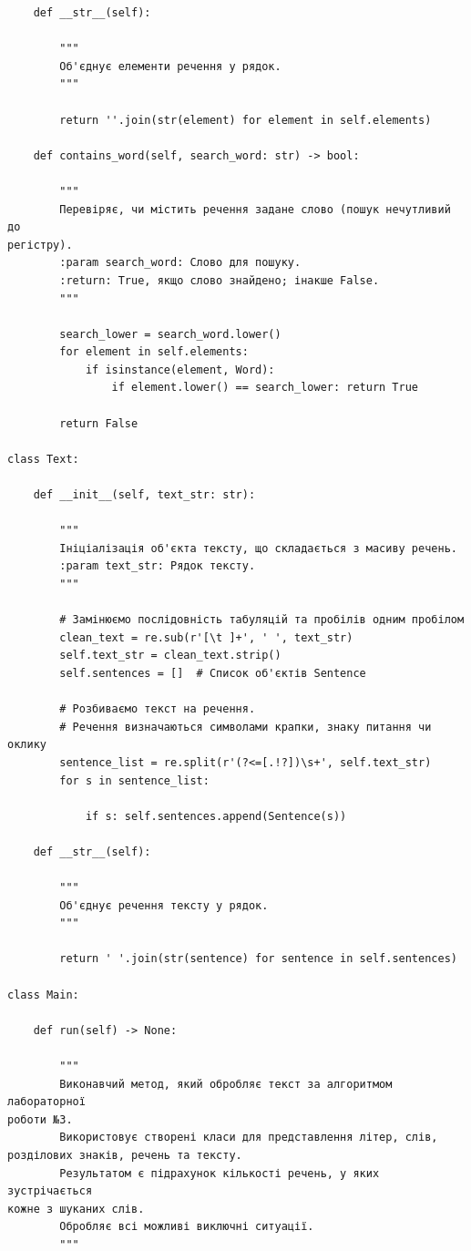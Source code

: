\documentclass[12pt,a4paper]{article}
\begin{document}
{\begin{verbatim}
    def __str__(self):

        """
        Об'єднує елементи речення у рядок.
        """

        return ''.join(str(element) for element in self.elements)

    def contains_word(self, search_word: str) -> bool:

        """
        Перевіряє, чи містить речення задане слово (пошук нечутливий до
регістру).
        :param search_word: Слово для пошуку.
        :return: True, якщо слово знайдено; інакше False.
        """

        search_lower = search_word.lower()
        for element in self.elements:
            if isinstance(element, Word):
                if element.lower() == search_lower: return True

        return False

class Text:

    def __init__(self, text_str: str):

        """
        Ініціалізація об'єкта тексту, що складається з масиву речень.
        :param text_str: Рядок тексту.
        """

        # Замінюємо послідовність табуляцій та пробілів одним пробілом
        clean_text = re.sub(r'[\t ]+', ' ', text_str)
        self.text_str = clean_text.strip()
        self.sentences = []  # Список об'єктів Sentence

        # Розбиваємо текст на речення.
        # Речення визначаються символами крапки, знаку питання чи оклику
        sentence_list = re.split(r'(?<=[.!?])\s+', self.text_str)
        for s in sentence_list:
    
            if s: self.sentences.append(Sentence(s))

    def __str__(self):

        """
        Об'єднує речення тексту у рядок.
        """

        return ' '.join(str(sentence) for sentence in self.sentences)

class Main:

    def run(self) -> None:

        """
        Виконавчий метод, який обробляє текст за алгоритмом лабораторної
роботи №3.
        Використовує створені класи для представлення літер, слів,
розділових знаків, речень та тексту.
        Результатом є підрахунок кількості речень, у яких зустрічається
кожне з шуканих слів.
        Обробляє всі можливі виключні ситуації.
        """


\end{verbatim}}
\end{document}
